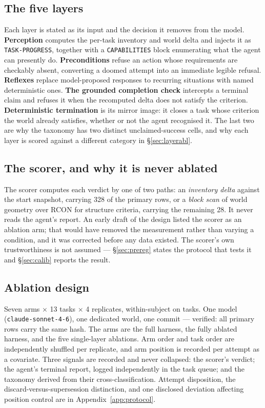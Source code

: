\documentclass[11pt]{article}
\begin{document}
\subsection{The five layers}
\label{sec:layers}

Each layer is stated as its input and the decision it removes from the
model. \textbf{Perception} computes the per-task inventory and world
delta and injects it as \texttt{TASK-PROGRESS}, together with a
\texttt{CAPABILITIES} block enumerating what the agent can presently do.
\textbf{Preconditions} refuse an action whose requirements are checkably
absent, converting a doomed attempt into an immediate legible refusal.
\textbf{Reflexes} replace model-proposed responses to recurring
situations with named deterministic ones. \textbf{The grounded
completion check} intercepts a terminal claim and refuses it when the
recomputed delta does not satisfy the criterion. \textbf{Deterministic
termination} is its mirror image: it closes a task whose criterion the
world already satisfies, whether or not the agent recognised it. The
last two are why the taxonomy has two distinct unclaimed-success cells,
and why each layer is scored against a different category in
\S\ref{sec:layerabl}.

\subsection{The scorer, and why it is never ablated}
\label{sec:scorer}

The scorer computes each verdict by one of two paths: an \emph{inventory
delta} against the start snapshot, carrying 328 of the \NPrimary{}
primary rows, or a \emph{block scan} of world geometry over RCON for
structure criteria, carrying the remaining 28. It never reads the
agent's report. An early draft of the design listed the scorer as an
ablation arm; that would have removed the measurement rather than
varying a condition, and it was corrected before any data existed. The
scorer's own trustworthiness is not assumed --- \S\ref{sec:prereg}
states the protocol that tests it and \S\ref{sec:calib} reports the
result.

\subsection{Ablation design}
\label{sec:design}

Seven arms $\times$ 13 tasks $\times$ 4 replicates, within-subject on
tasks. One model (\texttt{claude-sonnet-4-6}), one dedicated world, one
commit --- verified: all \NPrimary{} primary rows carry the same hash.
The arms are the full harness, the fully ablated harness, and the five
single-layer ablations. Arm order and task order are independently
shuffled per replicate, and arm position is recorded per attempt as a
covariate. Three signals are recorded and never collapsed: the scorer's
verdict; the agent's terminal report, logged independently in the task
queue; and the taxonomy derived from their cross-classification. Attempt
disposition, the discard-versus-supersession distinction, and one
disclosed deviation affecting position control are in
Appendix~\ref{app:protocol}.
\end{document}
